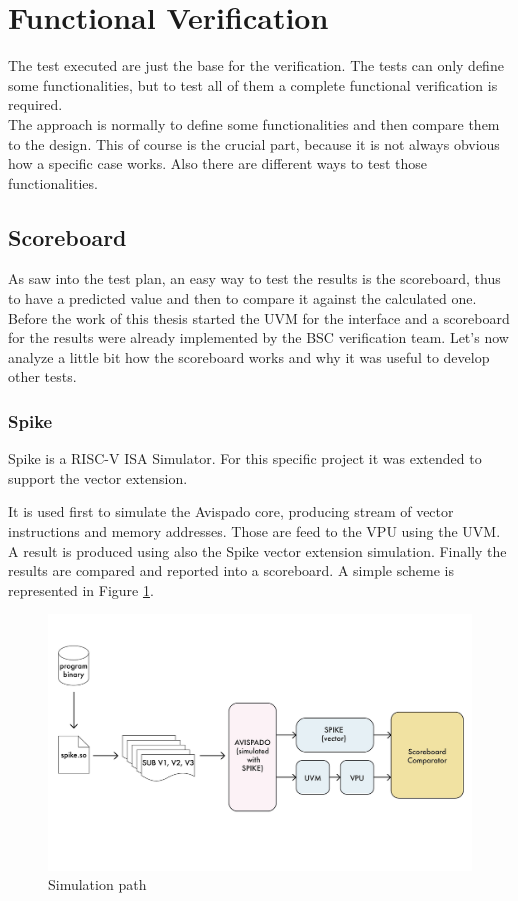 \section{Functional Verification}
The test executed are just the base for the verification. The tests can only define some functionalities, but to test all of them a complete functional verification is required.\\


The approach is normally to define some functionalities and then compare them to the design. This of course is the crucial part, because it is not always obvious how a specific case works. Also there are different ways to test those functionalities.\\

\subsection{Scoreboard}
As saw into the test plan, an easy way to test the results is the scoreboard, thus to have a predicted value and then to compare it against the calculated one.\\

Before the work of this thesis started the UVM for the interface and a scoreboard for the results were already implemented by the BSC verification team. Let's now analyze a little bit how the scoreboard works and why it was useful to develop other tests.

\subsubsection{Spike}
Spike is a RISC-V ISA Simulator. For this specific project it was extended to support the vector extension.

It is used first to simulate the Avispado core, producing stream of vector instructions and memory addresses. Those are feed to the VPU using the UVM. A result is produced using also the Spike vector extension simulation. Finally the results are compared and reported into a scoreboard. A simple scheme is represented in Figure \ref{bin-to-log}.

\begin{figure}[H]
    \centering
    \includegraphics[scale = 0.6]{Chapter_2/img/bin-to-log.png}
    \caption{Simulation path}
    \label{bin-to-log}
\end{figure}

